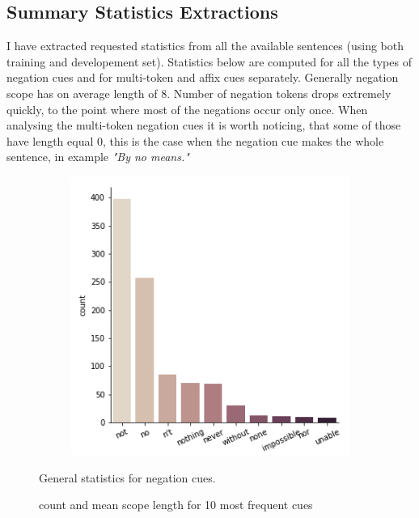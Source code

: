 \documentclass{article}
\begin{document}
\subsection{Summary Statistics Extractions}
I have extracted requested statistics from all the available sentences (using both
training and developement set). Statistics below are computed for all the types of negation
cues and for multi-token and affix cues separately. Generally negation scope has on average
length of $8$. Number of negation tokens drops extremely quickly, to the point where most of
the negations occur only once.
When analysing the multi-token negation cues it is worth noticing,
that some of those have length equal 0, this is the case when the negation cue makes the whole sentence,
in example \textit{"By no means."}
\begin{figure}[h]
    \begin{subfigure}{0.5\textwidth}
        \centering
        
    \end{subfigure}
    \begin{subfigure}{0.5\textwidth}
        \centering
        \includegraphics[scale=0.5]{../figures/negation_count.png}
    \end{subfigure}
    \caption{General statistics for negation cues.}
\end{figure}


\begin{figure}[h]
    \begin{subfigure}{0.45\textwidth}
        \centering
        
    \end{subfigure}
    \hfill
    \begin{subfigure}{0.45\textwidth}
        \centering
        
    \end{subfigure}
    \caption{count and mean scope length for 10 most frequent cues}
\end{figure}
\end{document}
